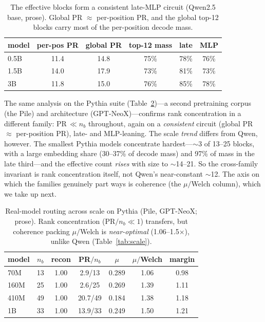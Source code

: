 \documentclass[sigconf,nonacm]{acmart}
\theoremstyle{definition}
\newcommand{\nb}{n_b}
\begin{document}
\begin{table}[t]
\caption{The effective blocks form a consistent late-MLP circuit (Qwen2.5 base,
prose). Global PR $\approx$ per-position PR, and the global top-12 blocks carry most
of the per-position decode mass.}
\label{tab:circuit}
\small
\begin{tabular}{lccccc}
\toprule
model & per-pos PR & global PR & top-12 mass & late & MLP \\
\midrule
0.5B & 11.4 & 14.8 & 75\% & 78\% & 76\% \\
1.5B & 14.0 & 17.9 & 73\% & 81\% & 73\% \\
3B   & 11.8 & 15.0 & 76\% & 85\% & 78\% \\
\bottomrule
\end{tabular}
\end{table}

The same analysis on the Pythia suite (Table~\ref{tab:scalepythia})---a second
pretraining corpus (the Pile) and architecture (GPT-NeoX)---confirms rank
concentration in a different family: PR$\,\ll\nb$ throughout, again on a
\emph{consistent} circuit (global PR $\approx$ per-position PR), late- and
MLP-leaning. The scale \emph{trend} differs from Qwen, however. The smallest Pythia
models concentrate hardest---$\sim$3 of 13--25 blocks, with a large embedding share
(30--37\% of decode mass) and 97\% of mass in the late third---and the effective
count \emph{rises} with size to $\sim$14--21. So the cross-family invariant is rank
concentration itself, not Qwen's near-constant $\sim$12. The axis on which the
families genuinely part ways is coherence (the $\mu/$Welch column), which we take up
next.

\begin{table}[t]
\caption{Real-model routing across scale on Pythia (Pile, GPT-NeoX; prose). Rank
concentration (PR$/\nb\ll1$) transfers, but coherence packing $\mu/$Welch is
\emph{near-optimal} (1.06--1.5$\times$), unlike Qwen (Table~\ref{tab:scale}).}
\label{tab:scalepythia}
\small
\begin{tabular}{lcccccc}
\toprule
model & $\nb$ & recon & PR$/\nb$ & $\mu$ & $\mu/$Welch & margin \\
\midrule
70M  & 13 & 1.00 & 2.9/13  & 0.289 & 1.06 & 0.98 \\
160M & 25 & 1.00 & 2.6/25  & 0.269 & 1.39 & 1.11 \\
410M & 49 & 1.00 & 20.7/49 & 0.184 & 1.38 & 1.18 \\
1B   & 33 & 1.00 & 13.9/33 & 0.249 & 1.50 & 1.21 \\
\bottomrule
\end{tabular}
\end{table}
\end{document}
